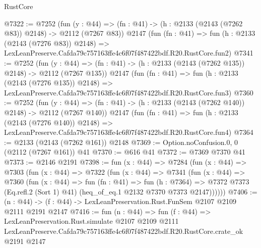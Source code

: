 \begin{lexlean}{RustCore}
\begin{coremodule}
@7322 := @7252
    (fun (y : @44) => (fn : @41) -> (h : @2133 (@2143 (@7262 @83)) @2148) -> @2112 (@7267 @83))
    @2147
    (fun (fn : @41) =>
    fun (h : @2133 (@2143 (@7276 @83)) @2148) =>
    LexLeanPreserve.Cafda79c757163ffe4c6f07f487422bdf.R20.RustCore.fun2)
@7341 := @7252
    (fun (y : @44) => (fn : @41) -> (h : @2133 (@2143 (@7262 @135)) @2148) -> @2112 (@7267 @135))
    @2147
    (fun (fn : @41) =>
    fun (h : @2133 (@2143 (@7276 @135)) @2148) =>
    LexLeanPreserve.Cafda79c757163ffe4c6f07f487422bdf.R20.RustCore.fun3)
@7360 := @7252
    (fun (y : @44) => (fn : @41) -> (h : @2133 (@2143 (@7262 @140)) @2148) -> @2112 (@7267 @140))
    @2147
    (fun (fn : @41) =>
    fun (h : @2133 (@2143 (@7276 @140)) @2148) =>
    LexLeanPreserve.Cafda79c757163ffe4c6f07f487422bdf.R20.RustCore.fun4)
@7364 := @2133 (@2143 (@7262 @161)) @2148
@7369 := Option.noConfusion.{0, 0} (@2112 (@7267 @161)) @41
@7370 := @616 @41
@7372 := @7369 @7370 @41
@7373 := @2146 @2191
@7398 := fun (x : @44) =>
  @7284
    (fun (x : @44) =>
    @7303
      (fun (x : @44) =>
      @7322
        (fun (x : @44) =>
        @7341
          (fun (x : @44) =>
          @7360
            (fun (x : @44) =>
            fun (fn : @41) =>
            fun (h : @7364) =>
            @7372 @7373 (Eq.refl.{2} (Sort 1) @41) (heq_of_eq.{1} @2132 @7370 @7373 @2147))))))
@7406 := (n : @44) -> (f : @44) -> LexLeanPreservation.Rust.FunSem @2107 @2109 @2111 @2191 @2147
@7416 := fun (n : @44) =>
  fun (f : @44) =>
  LexLeanPreservation.Rust.simulate
    @2107
    @2109
    @2111
    LexLeanPreserve.Cafda79c757163ffe4c6f07f487422bdf.R20.RustCore.crate_ok
    @2191
    @2147
\end{coremodule}
\end{lexlean}
